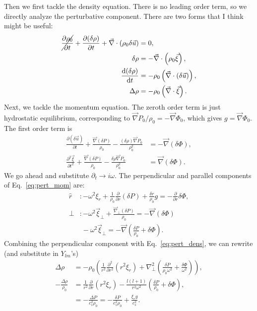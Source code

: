 \documentclass[11pt,
        usenames, %
        twocolumn,
        landscape,
        dvipsnames %
    ]{article}
\newcommand*{\rd}[2]{\frac{\mathrm{d}#1}{\mathrm{d}#2}}
\newcommand*{\pd}[2]{\frac{\partial#1}{\partial#2}}
\newcommand*{\ptd}[2]{\frac{\partial^2 #1}{\partial#2^2}}
\newcommand*{\p}[1]{\left(#1\right)}
\begin{document}
Then we first tackle the density equation. There is no leading order term, so we
directly analyze the perturbative component. There are two forms that I think
might be useful:
\begin{align}
    \cancel{\pd{\rho_0}{t}} +
    \pd{(\delta \rho)}{t} + \vec{\nabla} \cdot \p{\rho_0 \delta \vec{u}}
        &= 0,\nonumber\\
    \delta \rho &= -\vec{\nabla} \cdot \p{\rho_0 \vec{\xi}},\\
    \rd{(\delta \rho)}{t} &= -\rho_0\p{\vec{\nabla} \cdot \p{\delta \vec{u}}}
        ,\nonumber\\
    \Delta \rho &= -\rho_0\p{\vec{\nabla} \cdot \vec{\xi}}.\label{eq:pert_dens}
\end{align}
Next, we tackle the momentum equation. The zeroth order term is just hydrostatic
equilibrium, corresponding to $\vec{\nabla}P_0 / \rho_0 = -\vec{\nabla} \Phi_0$,
which gives $g = \vec{\nabla} \Phi_0$. The first order term is
\begin{align}
    \pd{(\delta \vec{u})}{t} + \frac{\vec{\nabla} (\delta P)}{\rho_0}
        - \frac{(\delta \rho) \vec{\nabla}P_0}{\rho_0^2} &=
        -\vec{\nabla}\p{\delta \Phi},\nonumber\\
    \ptd{\vec{\xi}}{t} + \frac{\vec{\nabla}(\delta P)}{\rho_0}
        - \frac{\delta \rho \vec{\nabla}P_0}{\rho_0^2} &= \vec{\nabla}(\delta
        \Phi).\label{eq:pert_mom}
\end{align}
We go ahead and substitute $\partial_t \to i\omega$. The perpendicular and
parallel components of Eq.~\eqref{eq:pert_mom} are:
\begin{align}
    \hat{r} &: -\omega^2 \xi_r + \frac{1}{\rho_0}\pd{}{r}(\delta P)
         + \frac{\delta r}{\rho_0}g = -\pd{}{r}\delta \Phi,\\
    \perp &: -\omega^2 \vec{\xi}_\perp + \frac{\vec{\nabla}_\perp (\delta P)}{
        \rho_0} = -\vec{\nabla}\p{\delta\Phi}\nonumber\\
        &\; -\omega^2\vec{\xi}_\perp = -\vec{\nabla}\p{\frac{\delta P}{\rho_0}
            + \delta \Phi}.
\end{align}
Combining the perpendicular component with Eq.~\eqref{eq:pert_dens}, we can
rewrite (and substitute in $Y_{lm}$'s)
\begin{align}
    \Delta \rho &= -\rho_0\p{\frac{1}{r^2}\ptd{}{r}\p{r^2\xi_r}
            + \nabla_\perp^2 \p{\frac{\delta P}{\rho_0\omega^2} + \frac{\delta
            \Phi}{\omega^2}}},\nonumber\\
    -\frac{\Delta \rho}{\rho_0}
        &= \frac{1}{r^2}\pd{}{r}\p{r^2\xi_r}
            - \frac{l(l + 1)}{r^2\omega^2}\p{\frac{\delta P}{\rho_0}
                + \delta \Phi},\nonumber\\
    &= -\frac{\Delta P}{c_s^2\rho_0} = -\frac{\delta P}{c_s^2\rho_0}
            + \frac{\xi_r g}{c_s^2}.
\end{align}
\end{document}
